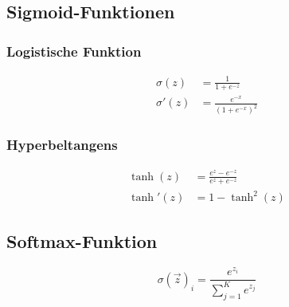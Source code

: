 \documentclass[12pt,titlepage]{article}
\begin{document}
\subsection{Sigmoid-Funktionen}

\subsubsection{Logistische Funktion}

\[
  \begin{aligned}
    \sigma(z)  & = \frac{1}{1 + e^{-z}}          \\
    \sigma'(z) & = \frac{e^{-x}}{(1 + e^{-x})^2}
  \end{aligned}
\]

\subsubsection{Hyperbeltangens}

\[
  \begin{aligned}
    \tanh(z)  & = \frac{e^z - e^{-z}}{e^z + e^{-z}} \\
    \tanh'(z) & = 1 - \tanh^2(z)
  \end{aligned}
\]


\subsection{Softmax-Funktion}

\[\sigma(\vec{z})_i = \frac{ e^{z_i} }{ \sum_{j=1}^{K} e^{z_j} }\]

\newpage
\printbibliography[heading=bibintoc, title={Literaturverweise}]
\end{document}
